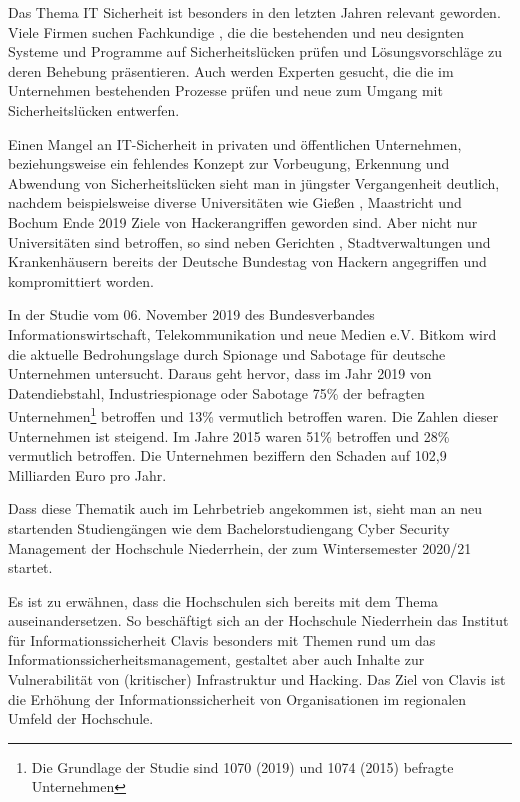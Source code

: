 \label{chap_text:Einleitung}
Das Thema IT Sicherheit ist besonders in den letzten Jahren relevant geworden. Viele Firmen suchen Fachkundige \cite{it-daily.netITSecurityExpertenWerdenHanderingend2019}, die die bestehenden und neu designten Systeme und Programme auf Sicherheitslücken prüfen und Lösungsvorschläge zu deren Behebung präsentieren. Auch werden Experten gesucht, die die im Unternehmen bestehenden Prozesse prüfen und neue zum Umgang mit Sicherheitslücken entwerfen.

Einen Mangel an IT-Sicherheit in privaten und öffentlichen Unternehmen, beziehungsweise ein fehlendes Konzept zur Vorbeugung, Erkennung und Abwendung von Sicherheitslücken sieht man in jüngster Vergangenheit deutlich, nachdem beispielsweise diverse Universitäten wie Gießen \cite{schirmacherUniGiessenNaehert2020}, Maastricht \cite{wdrCyberattackeHackerangriffAuf2019} und Bochum \cite{ruhr24HackerAngriffLegtITSysteme2020} Ende 2019 Ziele von \linebreak Hackerangriffen geworden sind. Aber nicht nur Universitäten sind betroffen, so sind neben Gerichten \cite{hurtzHackerAngriffAufGericht2020}, Stadtverwaltungen \cite{barsigCyberAttackeAufPotsdamer2020} und Krankenhäusern \cite{wellbrockITSicherheitImKrankenhaus2019} bereits der Deutsche Bundestag von Hackern angegriffen und kompromittiert worden. \cite{fladeCyberangriffAufBundestag2020}

In der Studie  vom 06. November 2019 des Bundesverbandes Informationswirtschaft, Telekommunikation und neue Medien e.V. Bitkom wird die aktuelle Bedrohungslage durch Spionage und Sabotage für deutsche Unternehmen untersucht. Daraus geht hervor, dass im Jahr 2019 von Datendiebstahl, Industriespionage oder Sabotage 75\% der befragten Unternehmen\footnote{Die Grundlage der Studie sind 1070 (2019) und 1074 (2015) befragte Unternehmen} betroffen  und 13\% vermutlich betroffen waren. Die Zahlen dieser Unternehmen ist steigend. Im Jahre 2015 waren  51\% betroffen und 28\% vermutlich betroffen. Die Unternehmen beziffern den Schaden auf 102,9 Milliarden Euro pro Jahr. \cite{bergWirtschaftsschutzDigitalenWelt2019}

Dass diese Thematik auch im Lehrbetrieb angekommen ist, sieht man an neu startenden Studiengängen wie dem Bachelorstudiengang Cyber Security Management der Hochschule Niederrhein, der zum Wintersemester 2020/21 startet. \cite{hochschuleniederrheinHackernRoteKarte2020}

Es ist zu erwähnen, dass die Hochschulen sich bereits mit dem Thema auseinandersetzen. 
So beschäftigt sich an der Hochschule Niederrhein das Institut für Informationssicherheit Clavis besonders mit Themen rund um das Informationssicherheitsmanagement, gestaltet aber auch Inhalte zur Vulnerabilität von (kritischer) Infrastruktur und Hacking.
Das Ziel von Clavis ist die Erhöhung der Informationssicherheit von Organisationen im regionalen Umfeld der Hochschule.
\cite{hochschuleniederrheinFlyerInstitutClavis}

